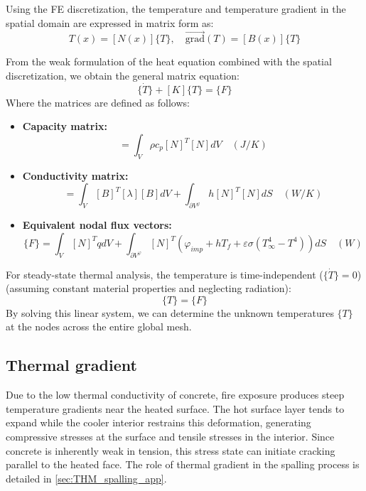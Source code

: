 Using the FE discretization, the temperature and temperature gradient in the spatial domain are expressed in matrix form as:
\begin{equation}
    T(x) = [N(x)]\{T\}, \quad \overrightarrow{\text{grad}}(T) = [B(x)]\{T\}
\end{equation}

From the weak formulation of the heat equation combined with the spatial discretization, we obtain the general matrix equation:
\begin{equation}
    [C]\{\dot{T}\} + [K]\{T\} = \{F\}
\end{equation}
Where the matrices are defined as follows:
\begin{itemize}
    \item \textbf{Capacity matrix:} 
    \begin{equation}
    [C] = \int_V \rho c_p [N]^T [N] dV \quad (J/K)
    \end{equation}

    \item \textbf{Conductivity matrix:} 
    \begin{equation}
    [K] = \int_V [B]^T [\lambda] [B] dV + \int_{\partial V^\varphi} h [N]^T [N] dS \quad (W/K)
    \end{equation}

    \item \textbf{Equivalent nodal flux vectors:} 
    \begin{equation}
    \{F\} = \int_V [N]^T q dV + \int_{\partial V^\varphi} [N]^T \left( \varphi_{imp} + hT_f + \varepsilon\sigma(T_\infty^4 - T^4) \right) dS \quad (W)
    \end{equation}
\end{itemize}

For steady-state thermal analysis, the temperature is time-independent ($\{\dot{T}\} = 0$) (assuming constant material properties and neglecting radiation):
\begin{equation}
    [K]\{T\} = \{F\}
\end{equation}
By solving this linear system, we can determine the unknown temperatures $\{T\}$ at the nodes across the entire global mesh.

\subsection{Thermal gradient} \label{sec:thermal_gradient}

Due to the low thermal conductivity of concrete, fire exposure produces steep temperature gradients near the heated surface. The hot surface layer tends to expand while the cooler interior restrains this deformation, generating compressive stresses at the surface and tensile stresses in the interior.
Since concrete is inherently weak in tension, this stress state can initiate cracking parallel to the heated face. The role of thermal gradient in the spalling process is detailed in \cref{sec:THM_spalling_app}.

